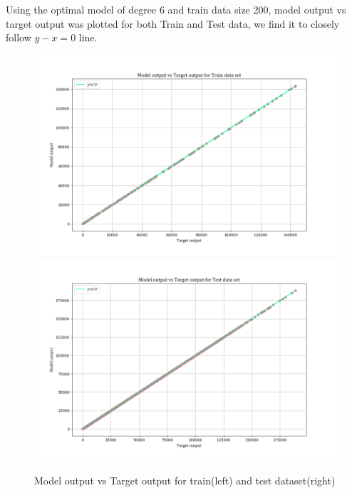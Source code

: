 \documentclass[12pt,a4paper]{article}
\begin{document}
Using the optimal model of degree 6 and train data size 200, model output vs target output was plotted for both Train and Test data, we find it to closely follow $y-x=0$ line.
\begin{figure}[H]
    \centering
    \includegraphics[scale=0.25]{images/tvsy_train.png}
    \includegraphics[scale=0.25]{images/tvsy_test.png}
    \caption{Model output vs Target output for train(left) and test dataset(right)}
    \label{fig:yvst}
\end{figure}

\break
\end{document}
